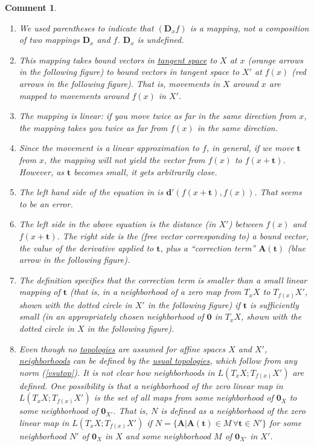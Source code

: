 \documentclass[letterpaper,12pt]{article}
\theoremstyle{plain}
\theoremstyle{plain}
\newtheorem*{cmnt*}{Comment}
\theoremstyle{definition}
\begin{document}
\begin{cmnt*}\leavevmode
\begin{enumerate}
\item We used parentheses to indicate that $(\mathbf{D}_xf)$ is a mapping, not a composition of two mappings $\mathbf{D}_x$ and $f$. $\mathbf{D}_x$ is undefined.
\item This mapping takes bound vectors in \hyperref[deftsp]{tangent space} to $X$ at $x$ (orange arrows in the following figure) to bound vectors in tangent space to $X'$ at $f(x)$ (red arrows in the following figure). That is, movements in $X$ around $x$ are mapped to movements around $f(x)$ in $X'$.
\item The mapping is linear: if you move twice as far in the same direction from $x$, the mapping takes you twice as far from $f(x)$ in the same direction.
\item Since the movement is a linear approximation to $f$, in general, if we move $\mathbf{t}$ from $x$, the mapping will not yield the vector from $f(x)$ to $f(x+\mathbf{t})$. However, as $\mathbf{t}$ becomes small, it gets arbitrarily close.
\item The left hand side of the equation in \citet{Dodson/Poston:1991} is $\mathbf{d}'\left( f(x+\mathbf{t}),f(x)\right)$. That seems to be an error.
\item The left side in the above equation is the distance (in $X'$) between $f(x)$ and $f(x+\mathbf{t})$. The right side is the (free vector corresponding to) a bound vector, the value of the derivative applied to $\mathbf{t}$, plus a ``correction term'' $\mathbf{A}(\mathbf{t})$ (blue arrow in the following figure).
\item The definition specifies that the correction term is smaller than a small linear mapping of $\mathbf{t}$ (that is, in a neighborhood of a zero map from $T_xX$ to $T_{f(x)}X'$, shown with the dotted circle in $X'$ in the following figure) if $\mathbf{t}$ is sufficiently small (in an appropriately chosen neighborhood of $\mathbf{0}$ in $T_xX$, shown with the dotted circle in $X$ in the following figure).
\item Even though no \hyperref[deftop]{topologies} are assumed for affine spaces $X$ and $X'$, \hyperref[defngbr]{neighborhoods}
can be defined by the \hyperref[defutop]{usual topologies}, which follow from any norm (\autoref{vsutop}). It is not clear how neighborhoods in $L(T_xX;T_{f(x)}X')$ are defined. One possibility is that a neighborhood of the zero linear map in $L(T_xX;T_{f(x)}X')$ is the set of all maps from some neighborhood of  $\mathbf{0}_X$ to some neighborhood of $\mathbf{0}_{X'}$. That is, $N$ is defined as a neighborhood of the zero linear map in $L(T_xX;T_{f(x)}X')$ if $N=\{\mathbf{A}|\mathbf{A}(\mathbf{t})\in M \,\forall \mathbf{t}\in N'\}$ for some neighborhood $N'$ of $\mathbf{0}_X$ in $X$ and some neighborhood $M$ of $\mathbf{0}_{X'}$ in $X'$.
\end{enumerate}
\end{cmnt*}
\end{document}
